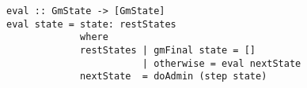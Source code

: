 \begin{verbatim}
eval :: GmState -> [GmState]
eval state = state: restStates
             where
             restStates | gmFinal state = []
                        | otherwise = eval nextState
             nextState  = doAdmin (step state)
\end{verbatim}
